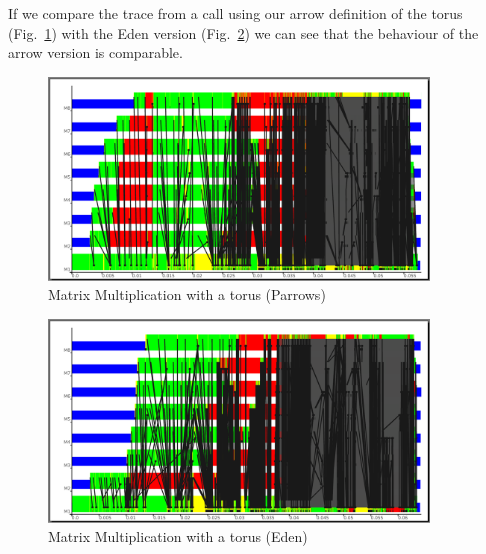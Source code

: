 If we compare the trace from a call using our arrow definition of the torus (Fig.~\ref{fig:torus_parrows_trace}) with the Eden version (Fig.~\ref{fig:torus_eden_trace}) we can see that the behaviour of the arrow version is comparable.
\begin{figure}[ht]
	\centering
	\includegraphics[width=0.9\textwidth]{images/torus_matrix_parrows_scale}
	\caption[Matrix Multiplication with a torus (Parrows)]{Matrix Multiplication with a torus (Parrows)}
	\label{fig:torus_parrows_trace}
\end{figure}

\begin{figure}[ht]
	\centering
	\includegraphics[width=0.9\textwidth]{images/torus_matrix_eden_scale}
	\caption[Matrix Multiplication with a torus (Eden)]{Matrix Multiplication with a torus (Eden)}
	\label{fig:torus_eden_trace}
\end{figure}

\FloatBarrier

